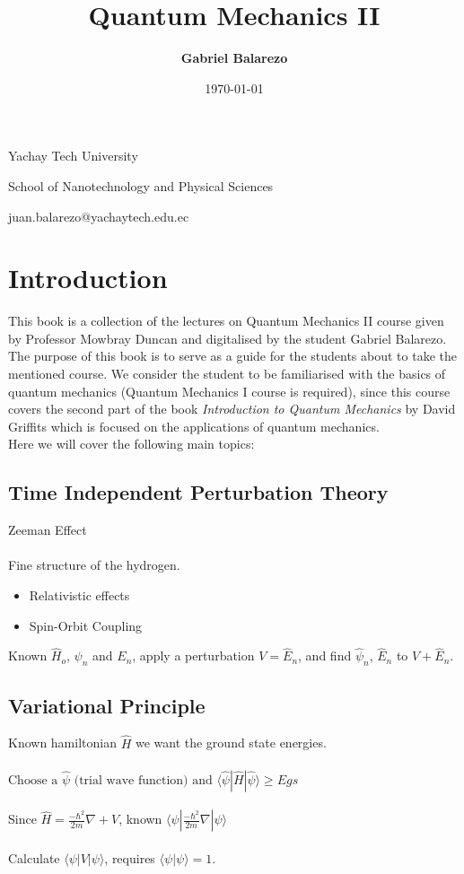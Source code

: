 \documentclass[12pt,fancychapters]{report}
\title{\textbf{{}Quantum Mechanics II}}
\author{\textbf{Gabriel Balarezo}}
\date{\today}
\makeatletter
\numberwithin{equation}{section}
\newcommand{\university}{Yachay Tech University }
\newcommand{\department}{School of Nanotechnology and Physical Sciences}
\newcommand{\email}{juan.balarezo@yachaytech.edu.ec}
\renewcommand{\maketitle}{
    \begin{titlepage}
        \vspace*{\fill}
        \begin{center}
            {\LARGE\@title\par}
            \vspace{0.5cm}
            \LARGE\university\par
            \vspace{0.5cm}
            \LARGE\department\par
            \vspace{1cm}
            \large\@author\par
            \vspace{0.5cm}
            \large\email\par
            \vspace{0.5cm}
            \large\@date\par
        \end{center}
        \vspace*{\fill}
    \end{titlepage}
}
\makeatother
\begin{document}
\maketitle
{}
\newpage
{}
\tableofcontents
\newpage
{}
\chapter*{Introduction}
This book is a collection of the lectures on Quantum Mechanics II course given by Professor Mowbray Duncan and digitalised by the student Gabriel Balarezo. The purpose of this book is to serve as a guide for the students about to take the mentioned course. We consider the student to be familiarised with the basics of quantum mechanics (Quantum Mechanics I course is required), since this course covers the second part of the book \emph{Introduction to Quantum Mechanics} by David Griffits which is focused on the applications of quantum mechanics.
\\
Here we will cover the following main topics:


\section{Time Independent Perturbation Theory}
Zeeman Effect
\\
\\
Fine structure of the hydrogen.
\begin{itemize}
	\item Relativistic effects 

	\item Spin-Orbit Coupling
\end{itemize}

Known $\hat{H}_o$, $\psi_n$ and $E_n$, apply a perturbation $V = \hat{E}_n$, and find $\hat{\psi}_n$, $\hat{E}_n$ to 
$V + \hat{E}_n$.

\section{Variational Principle}

Known hamiltonian $\hat{H}$ we want the ground state energies.
\\
\\
$\text{Choose a } \hat{\psi} \text{ (trial wave function) and } \langle \hat{\psi}|\hat{H}|\hat{\psi} \rangle \geq Egs $
\\
\\
Since $\hat{H} = \frac{-\hbar^2}{2m}\nabla + V$, known $\langle \psi | \frac{-\hbar^2}{2m}\nabla | \psi \rangle $
\\
\\
Calculate  $\langle \psi | V | \psi \rangle$, requires $\langle \psi | \psi \rangle = 1 $.
\end{document}
